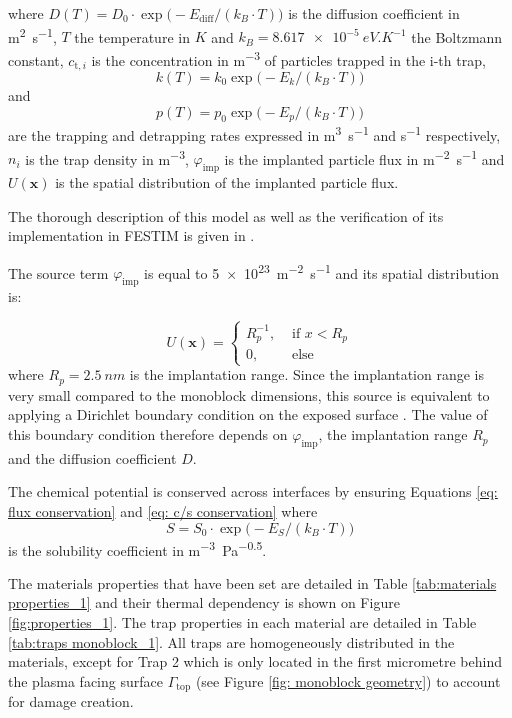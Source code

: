 where ${D(T)=D_0 \cdot \exp\big(-E_\mathrm{diff}/ (k_B \cdot T )\big)}$ is the diffusion coefficient in \si{m^2.s^{-1}}, $T$ the temperature in $\si{K}$ and ${k_B = \SI{8.617e-5}{eV.K^{-1}}}$ the Boltzmann constant, $c_{\mathrm{t}, i}$ is the concentration in \si{m^{-3}} of particles trapped in the i-th trap,
\begin{equation}
    k(T)=k_0\exp{\big(-E_{k} / (k_B \cdot T ) \big)}
\end{equation} and 
\begin{equation}
    p(T)=p_0\exp{\big(-E_{p}/ (k_B \cdot T )\big)}
\end{equation} 
are the trapping and detrapping rates expressed in \si{m^3.s^{-1}} and \si{s^{-1}} respectively, $n_i$ is the trap density in \si{m^{-3}}, $\varphi_\mathrm{imp}$ is the implanted particle flux in \si{m^{-2}.s^{-1}} and $U(\textbf{x})$ is the spatial distribution of the implanted particle flux.

The thorough description of this model as well as the verification of its implementation in FESTIM is given in .

The source term $\varphi_\mathrm{imp}$ is equal to \SI{5e23}{m^{-2}.s^{-1}} and its spatial distribution is:

\begin{equation}
    U(\textbf{x}) = \begin{cases}
    R_p^{-1},& \text{ if } x < R_p\\
    0,& \text{ else }
    \end{cases}
\end{equation}
where $R_p = \SI{2.5}{nm}$ is the implantation range.
Since the implantation range is very small compared to the monoblock dimensions, this source is equivalent to applying a Dirichlet boundary condition on the exposed surface .
The value of this boundary condition therefore depends on $\varphi_\mathrm{imp}$, the implantation range $R_p$ and the diffusion coefficient $D$.


The chemical potential is conserved across interfaces by ensuring Equations \ref{eq: flux conservation} and \ref{eq: c/s conservation} where 
\begin{equation}
    {S = S_0 \cdot \exp\big(-E_S/ (k_B \cdot T )\big)}
\end{equation} is the solubility coefficient in \si{m^{-3}.Pa^{-0.5}}.

The materials properties that have been set are detailed in Table \ref{tab:materials properties_1} and their thermal dependency is shown on Figure \ref{fig:properties_1}.
The trap properties in each material are detailed in Table \ref{tab:traps monoblock_1}.
All traps are homogeneously distributed in the materials, except for Trap 2 which is only located in the first micrometre behind the plasma facing surface $\Gamma_\mathrm{top}$ (see Figure \ref{fig: monoblock geometry}) to account for damage creation.


